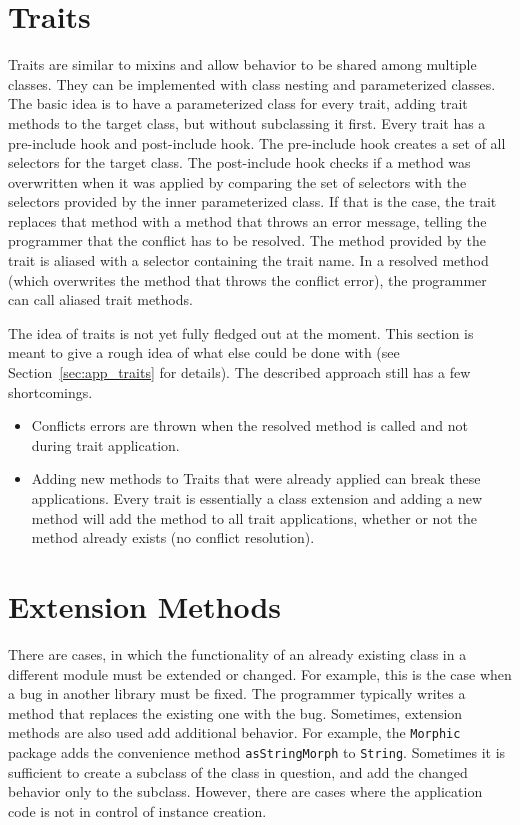 \section{Traits}
\label{sec:use_cases_traits}
Traits are similar to mixins and allow behavior to be shared among multiple classes. They can be implemented with class nesting and parameterized classes. The basic idea is to have a parameterized class for every trait, adding trait methods to the target class, but without subclassing it first. Every trait has a pre-include hook and post-include hook. The pre-include hook creates a set of all selectors for the target class. The post-include hook checks if a method was overwritten when it was applied by comparing the set of selectors with the selectors provided by the inner parameterized class. If that is the case, the trait replaces that method with a method that throws an error message, telling the programmer that the conflict has to be resolved. The method provided by the trait is aliased with a selector containing the trait name. In a resolved method (which overwrites the method that throws the conflict error), the programmer can call aliased trait methods.

The idea of traits is not yet fully fledged out at the moment. This section is meant to give a rough idea of what else could be done with \msname (see Section~\ref{sec:app_traits} for details). The described approach still has a few shortcomings.
\begin{itemize}
    \item Conflicts errors are thrown when the resolved method is called and not during trait application.
    \item Adding new methods to Traits that were already applied can break these applications. Every trait is essentially a class extension and adding a new method will add the method to all trait applications, whether or not the method already exists (no conflict resolution).
\end{itemize}

\section{Extension Methods}
\label{sec:usecases_ext_meth}
There are cases, in which the functionality of an already existing class in a different module must be extended or changed. For example, this is the case when a bug in another library must be fixed. The programmer typically writes a method that replaces the existing one with the bug. Sometimes, extension methods are also used add additional behavior. For example, the \texttt{Morphic} package adds the convenience method \texttt{asStringMorph} to \texttt{String}. Sometimes it is sufficient to create a subclass of the class in question, and add the changed behavior only to the subclass. However, there are cases where the application code is not in control of instance creation.

